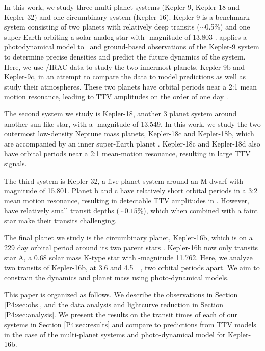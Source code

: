 In this work, we study three multi-planet systems (Kepler-9, Kepler-18 and Kepler-32) and one circumbinary system (Kepler-16). Kepler-9 is a benchmark system consisting of two planets with relatively deep transits ($\sim$0.5\%) and one super-Earth orbiting a solar analog star with \Kepler-magnitude of 13.803 \citep{Holman2010}. \citet{Freudenthal2018} applies a photodynamical model to \Kepler~and ground-based observations of the Kepler-9 system to determine precise densities and predict the future dynamics of the system. Here, we use \spitzer/IRAC data to study the two innermost planets, Kepler-9b and Kepler-9c, in an attempt to compare the data to model predictions as well as study their atmospheres. These two planets have orbital periods near a 2:1 mean motion resonance, leading to TTV amplitudes on the order of one day \citep{Freudenthal2018}.

The second system we study is Kepler-18, another 3 planet system around another sun-like star, with a \Kepler-magnitude of 13.549. In this work, we study the two outermost low-density Neptune mass planets, Kepler-18c and Kepler-18b, which are accompanied by an inner super-Earth planet \citet{Cochran2011}. Kepler-18c and Kepler-18d also have orbital periods near a 2:1 mean-motion resonance, resulting in large TTV signals.

The third system is Kepler-32, a five-planet system around an M dwarf \citep{Muirhead2012} with \Kepler-magnitude of 15.801. Planet b and c have relatively short orbital periods in a 3:2 mean motion resonance, resulting in detectable TTV amplitudes in \Kepler. However, have relatively small transit depths ($\sim0.15$\%), which when combined with a faint star make their transits challenging.

The final planet we study is the circumbinary planet, Kepler-16b, which is on a 229 day orbital period around its two parent stars \citep{Doyle2011}. Kepler-16b now only transits star A, a 0.68 solar mass K-type star with \Kepler-magnitude 11.762. Here, we analyze two transits of Kepler-16b, at 3.6 and 4.5~\um~, two orbital periods apart. We aim to constrain the dynamics and planet mass using photo-dynamical models.


This paper is organized as follows. We describe the observations in Section \ref{P4:sec:obs}, and the data analysis and lightcurve reduction in Section \ref{P4:sec:analysis}. We present the results on the transit times of each of our systems in Section \ref{P4:sec:results} and compare to predictions from TTV models in the case of the multi-planet systems and photo-dynamical model for Kepler-16b.

